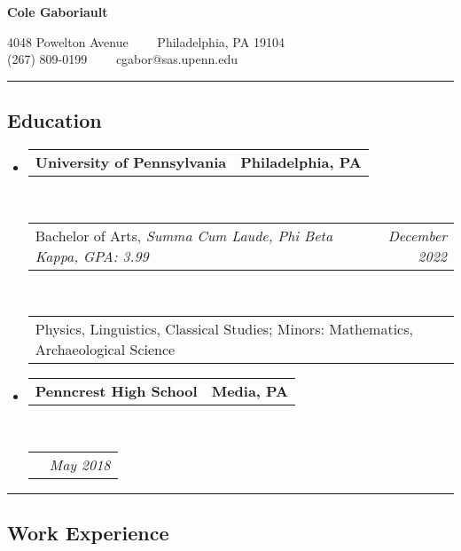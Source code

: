 \documentclass[11pt,letterpaper]{article}
\makeatletter
\newcommand{\headerrow}[2]
{\begin{tabular*}{\linewidth}{l@{\extracolsep{\fill}}r}
	#1 &
	#2 \\
\end{tabular*}}
\makeatother
\begin{document}
\begin{center}
{\LARGE \bfseries Cole Gaboriault}

4048 Powelton Avenue\ \ \textbullet
\ \ Philadelphia, PA 19104
\\
(267) 809-0199\ \ \textbullet
\ \ cgabor@sas.upenn.edu
\end{center}


\hrule
\vspace{-0.4em}
\subsection*{Education}

\begin{itemize}
	\parskip=0.1em

	\item
	\headerrow
		{\bfseries University of Pennsylvania}
		{\bfseries Philadelphia, PA}
	\\
	\headerrow
		{Bachelor of Arts, \em Summa Cum Laude, Phi Beta Kappa, GPA: 3.99}
		{\em December 2022}
	\\
	\headerrow
		{Physics, Linguistics, Classical Studies; Minors: Mathematics, Archaeological Science}{}

	\item
	\headerrow
		{\bfseries Penncrest High School}
		{\bfseries Media, PA}
	\\
	\headerrow
		{}
		{\em May 2018}

\end{itemize}

\hrule
\vspace{-0.4em}
\subsection*{Work Experience}
\end{document}
